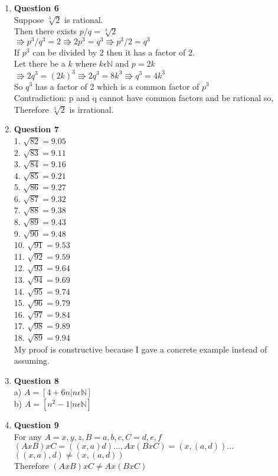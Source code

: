 \documentclass[12pt]{article}
\begin{document}
\begin{enumerate}
\item {\bf{Question 6}} \\
Suppose $\sqrt[3]{2}$ is rational. \\
Then there exists $p/q = \sqrt[3]{2}$ \\
$\Rrightarrow p^3/q^3 = 2 \Rrightarrow 2p^3 = q^3 \Rrightarrow p^3/2 = q^3$ \\
If $p^3$ can be divided by 2 then it has a factor of 2. \\
Let there be a $k$ where $k \epsilon \mathbb{N}$ and $p = 2k$ \\
$\Rrightarrow 2q^3 = (2k)^3 \Rrightarrow 2q^3 = 8k^3 \Rrightarrow q^3 = 4k^3$ \\
So $q^3$ has a factor of 2 which is a common factor of  $p^3$ \\
Contradiction: p and q cannot have common factors and be rational so, \\
Therefore $\sqrt[3]{2}$  is irrational.\\
\item {\bf{Question 7}} \\
1.  $\sqrt{82} = 9.05$ \\
2.  $\sqrt{83} = 9.11$ \\
3.  $\sqrt{84} = 9.16$ \\
4.  $\sqrt{85} = 9.21$ \\
5.  $\sqrt{86} = 9.27$ \\
6.  $\sqrt{87} = 9.32$ \\
7.  $\sqrt{88} = 9.38$ \\
8.  $\sqrt{89} = 9.43$ \\
9.  $\sqrt{90} = 9.48$ \\
10. $\sqrt{91} = 9.53$ \\
11. $\sqrt{92} = 9.59$ \\
12. $\sqrt{93} = 9.64$ \\
13. $\sqrt{94} = 9.69$ \\
14. $\sqrt{95} = 9.74$ \\
15. $\sqrt{96} = 9.79$ \\
16. $\sqrt{97} = 9.84$ \\
17. $\sqrt{98} = 9.89$ \\
18. $\sqrt{89} = 9.94$ \\
My proof is constructive because I gave a concrete example instead of assuming. \\
\item {\bf{Question 8}} \\
a) $A = [4+6n | n \epsilon \mathbb{N}]$ \\
b) $A = [n^2 -1 | n \epsilon \mathbb{N}]$ \\
\item {\bf{Question 9}} \\
For any $A = {x,y,z}, B = {a,b,c}, C = {d,e,f}$ \\
$(A x B) x C = {((x,a)d) ...}, A x (B x C) = { (x, (a,d)) ... }$ \\
$ ((x,a),d) \ne (x, (a,d))$ \\
Therefore $(A x B) x C \ne A x (B x C)$

\end{enumerate}
\end{document}
